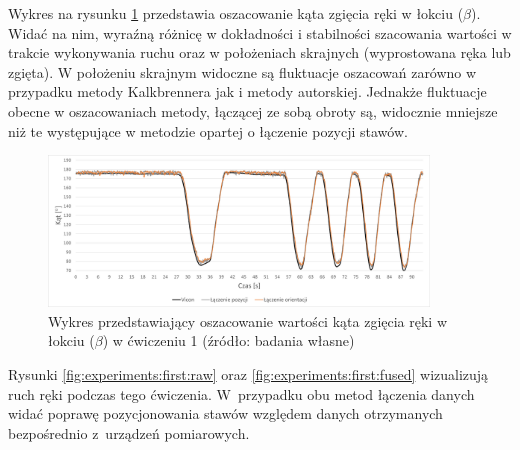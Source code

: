 Wykres na rysunku \ref{fig:experiments:first:angle} przedstawia oszacowanie kąta zgięcia ręki w łokciu ($\beta$). Widać na nim, wyraźną różnicę w dokładności i stabilności szacowania wartości w trakcie wykonywania ruchu oraz w położeniach skrajnych (wyprostowana ręka lub zgięta). W położeniu skrajnym widoczne są fluktuacje oszacowań zarówno w przypadku metody Kalkbrennera jak i metody autorskiej. Jednakże fluktuacje obecne w oszacowaniach metody, łączącej ze sobą obroty są, widocznie mniejsze niż te występujące w metodzie opartej o łączenie pozycji stawów.
			
\begin{figure}[!htb]
	\centering
	\includegraphics[width=0.9\textwidth]{images/100/angle.png}
	\caption{Wykres przedstawiający oszacowanie wartości kąta zgięcia ręki w łokciu ($\beta$) w ćwiczeniu 1 (źródło: badania własne)}
	\label{fig:experiments:first:angle}
\end{figure}
												
Rysunki \ref{fig:experiments:first:raw} oraz \ref{fig:experiments:first:fused} wizualizują ruch ręki podczas tego ćwiczenia. W~przypadku obu metod łączenia danych widać poprawę pozycjonowania stawów względem danych otrzymanych bezpośrednio z~urządzeń pomiarowych. 
					
